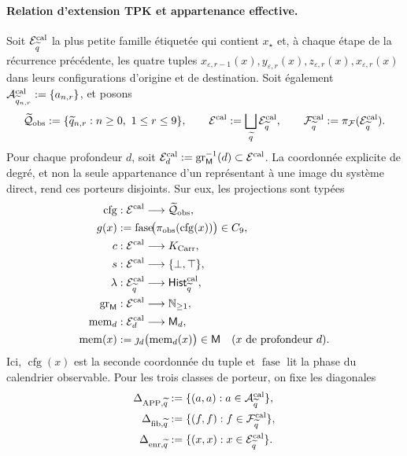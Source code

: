 \paragraph{Relation d’extension TPK et appartenance effective.}
Soit \(\mathcal E^{\rm cal}_{\widetilde q}\) la plus petite famille étiquetée qui contient
\(x_\star\) et, à chaque étape de la récurrence précédente, les quatre tuples
\(x_{\varepsilon,r-1}(x),y_{\varepsilon,r}(x),
z_{\varepsilon,r}(x),x_{\varepsilon,r}(x)\) dans leurs configurations d’origine
et de destination. Soit également
\(\mathcal A^{\rm cal}_{\widetilde q_{n,r}}:=\{a_{n,r}\}\), et posons
\[
 \widetilde{\mathcal Q}_{\rm obs}:=
   \{\widetilde q_{n,r}:n\ge0,\ 1\le r\le9\},
 \qquad
 \mathcal E^{\rm cal}:=\bigsqcup_{\widetilde q}
     \mathcal E^{\rm cal}_{\widetilde q},
 \qquad
 \mathcal F^{\rm cal}_{\widetilde q}:=
     \pi_{\mathcal F}(\mathcal E^{\rm cal}_{\widetilde q}).
\]
Pour chaque profondeur \(d\), soit
\(\mathcal E^{\rm cal}_d:=
\operatorname{gr}_{\mathsf M}^{-1}(d)\subset\mathcal E^{\rm cal}\). La
coordonnée explicite de degré, et non la seule appartenance d’un représentant à
une image du système direct, rend ces porteurs disjoints. Sur eux,
les projections sont typées
\[
\begin{aligned}
 \operatorname{cfg}&:\mathcal E^{\rm cal}\longrightarrow
     \widetilde{\mathcal Q}_{\rm obs},\\
 g(x)&:=\operatorname{fase}\!
       \bigl(\pi_{\rm obs}(\operatorname{cfg}(x))\bigr)\in C_9,\\
 c&:\mathcal E^{\rm cal}\longrightarrow K_{\rm Carr},\\
 s&:\mathcal E^{\rm cal}\longrightarrow\{\bot,\top\},\\
 \lambda&:\mathcal E^{\rm cal}_{\widetilde q}
       \longrightarrow\mathsf{Hist}^{\rm cal}_{\widetilde q},\\
 \operatorname{gr}_{\mathsf M}&:\mathcal E^{\rm cal}
       \longrightarrow\mathbb N_{\ge1},\\
 \operatorname{mem}_d&:\mathcal E^{\rm cal}_d
       \longrightarrow\mathsf M_d,\\
 \operatorname{mem}(x)&:=
       \jmath_d\bigl(\operatorname{mem}_d(x)\bigr)\in\mathsf M
       \quad(x\text{ de profondeur }d).
\end{aligned}
\]
Ici, \(\operatorname{cfg}(x)\) est la seconde coordonnée du tuple et
\(\operatorname{fase}\) lit la phase du calendrier observable. Pour les trois
classes de porteur, on fixe les diagonales
\[
\begin{aligned}
 \Delta_{\mathrm{APP},\widetilde q}
   &:=\{(a,a):a\in\mathcal A^{\rm cal}_{\widetilde q}\},\\
 \Delta_{{\rm fib},\widetilde q}
   &:=\{(f,f):f\in\mathcal F^{\rm cal}_{\widetilde q}\},\\
 \Delta_{{\rm enr},\widetilde q}
   &:=\{(x,x):x\in\mathcal E^{\rm cal}_{\widetilde q}\}.
\end{aligned}
\]
